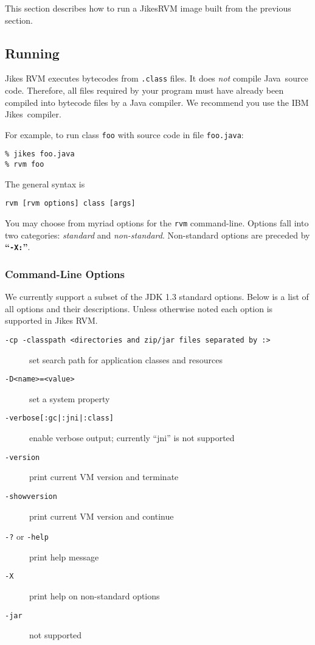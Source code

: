This section describes how to run a Jikes\trademark RVM  image built
from the previous section. 

\subsection{Running \jrvm}

Jikes RVM executes bytecodes from {\tt .class} files. It does {\em
not} compile 
Java\trademark\ source code. Therefore, all files 
required by your program must have already been compiled into bytecode
files by a Java compiler.  We recommend you use the IBM Jikes\trademark\ compiler.

For example, to run class {\tt foo} with source code in file {\tt foo.java}:
\begin{verbatim}
% jikes foo.java
% rvm foo 
\end{verbatim}

The general syntax is
\begin{verbatim}
rvm [rvm options] class [args]
\end{verbatim}

You may choose from myriad options for the {\tt rvm} command-line.  
Options fall into two categories: {\em standard} and {\em
non-standard}.  Non-standard options are preceded by {\bf ``{\tt -X:}''}.

\subsubsection{Command-Line Options}

We currently support a subset of the JDK 1.3 standard options.  Below
is a list of all options and their descriptions.  Unless otherwise noted each
option is supported in Jikes RVM.
\begin{description}
\item[{\tt -cp -classpath <directories and zip/jar files separated by :>}]
set search path for application classes and resources

\item[{\tt -D<name>=<value>}] set a system property

\item[{\tt -verbose[:gc|:jni|:class]}]
enable verbose output; currently ``jni'' is not supported

\item[{\tt -version}] print current VM version and terminate

\item[{\tt -showversion}] print current VM version and continue

\item[{\tt -?} or {\tt -help}] print help message

\item[{\tt -X}] print help on non-standard options

\item[{\tt -jar}] not supported

\end{description}

